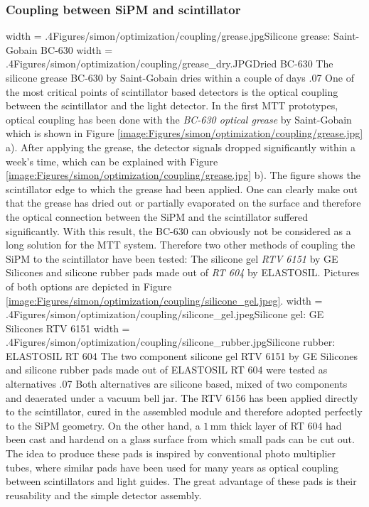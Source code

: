 \subsubsection{Coupling between SiPM and scintillator}
\doubleimage 
{width = .4\textwidth}{Figures/simon/optimization/coupling/grease.jpg}{Silicone grease: Saint-Gobain BC-630}
{width = .4\textwidth}{Figures/simon/optimization/coupling/grease_dry.JPG}{Dried BC-630}
{The silicone grease BC-630 by Saint-Gobain dries within a couple of days}
{.07\textwidth}
One of the most critical points of scintillator based detectors is the optical coupling between the scintillator and the light detector. In the first MTT prototypes, optical coupling has been done with the \emph{BC-630 optical grease} by Saint-Gobain which is shown in Figure \ref{image:Figures/simon/optimization/coupling/grease.jpg} a). After applying the grease, the detector signals dropped significantly within a week's time, which can be explained with Figure \ref{image:Figures/simon/optimization/coupling/grease.jpg} b). The figure shows the scintillator edge to which the grease had been applied. One can clearly make out that the grease has dried out or partially evaporated on the surface and therefore the optical connection between the SiPM and the scintillator suffered significantly. With this result, the BC-630 can obviously not be considered as a long solution for the MTT system. Therefore two other methods of coupling the SiPM to the scintillator have been tested: The silicone gel \emph{RTV 6151} by GE Silicones and silicone rubber pads made out of \emph{RT 604} by ELASTOSIL. Pictures of both options are depicted in Figure \ref{image:Figures/simon/optimization/coupling/silicone_gel.jpeg}.
\doubleimage
{width = .4\textwidth}{Figures/simon/optimization/coupling/silicone_gel.jpeg}{Silicone gel: GE Silicones RTV 6151}
{width = .4\textwidth}{Figures/simon/optimization/coupling/silicone_rubber.jpg}{Silicone rubber: ELASTOSIL RT 604}
{The two component silicone gel RTV 6151 by GE Silicones and silicone rubber pads made out of ELASTOSIL RT 604 were tested as alternatives}
{.07\textwidth}
Both alternatives are silicone based, mixed of two components and deaerated under a vacuum bell jar. The RTV 6156 has been applied directly to the scintillator, cured in the assembled module and therefore adopted perfectly to the SiPM geometry. On the other hand, a $1\,\text{mm}$ thick layer of RT 604 had been cast and hardend on a glass surface from which small pads can be cut out. The idea to produce these pads is inspired by conventional photo multiplier tubes, where similar pads have been used for many years as optical coupling between scintillators and light guides. The great advantage of these pads is their reusability and the simple detector assembly.

